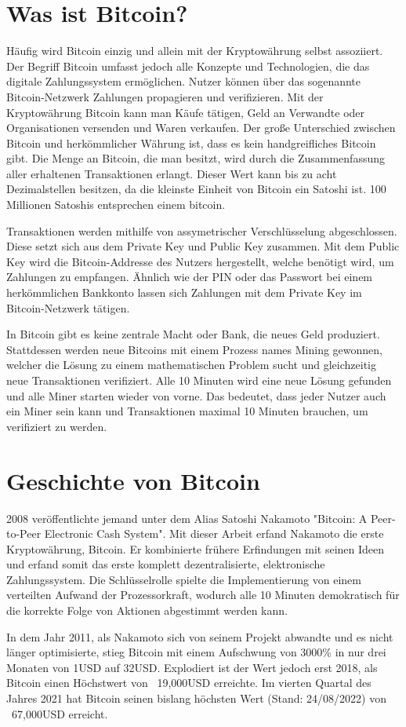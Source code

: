 \section{Was ist Bitcoin?}
Häufig wird Bitcoin einzig und allein mit der Kryptowährung selbst assoziiert. Der Begriff Bitcoin umfasst jedoch alle 
Konzepte und Technologien, die das digitale Zahlungssystem ermöglichen. Nutzer können über das sogenannte Bitcoin-Netzwerk 
Zahlungen propagieren und verifizieren. Mit der Kryptowährung Bitcoin kann man Käufe tätigen, Geld an Verwandte oder
Organisationen versenden und Waren verkaufen. Der große Unterschied zwischen Bitcoin und herkömmlicher Währung ist, dass es 
kein handgreifliches Bitcoin gibt. Die Menge an Bitcoin, die man besitzt, wird durch die Zusammenfassung aller erhaltenen 
Transaktionen erlangt. Dieser Wert kann bis zu acht Dezimalstellen besitzen, da die kleinste Einheit von Bitcoin ein Satoshi
ist. 100 Millionen Satoshis entsprechen einem bitcoin.

Transaktionen werden mithilfe von assymetrischer Verschlüsselung abgeschlossen. Diese setzt sich aus dem Private Key und Public
Key zusammen. Mit dem Public Key wird die Bitcoin-Addresse des Nutzers hergestellt, welche benötigt wird, um Zahlungen zu
empfangen. Ähnlich wie der PIN oder das Passwort bei einem herkömmlichen Bankkonto lassen sich Zahlungen mit dem Private Key
im Bitcoin-Netzwerk tätigen.

In Bitcoin gibt es keine zentrale Macht oder Bank, die neues Geld produziert. Stattdessen werden neue Bitcoins mit einem Prozess
names Mining gewonnen, welcher die Lösung zu einem mathematischen Problem sucht und gleichzeitig neue Transaktionen verifiziert.
Alle 10 Minuten wird eine neue Lösung gefunden und alle Miner starten wieder von vorne. Das bedeutet, dass jeder Nutzer auch ein
Miner sein kann und Transaktionen maximal 10 Minuten brauchen, um verifiziert zu werden.

\section{Geschichte von Bitcoin}
2008 veröffentlichte jemand unter dem Alias Satoshi Nakamoto "Bitcoin: A Peer-to-Peer Electronic Cash System". Mit dieser Arbeit
erfand Nakamoto die erste Kryptowährung, Bitcoin. Er kombinierte frühere Erfindungen mit seinen Ideen und erfand somit das erste
komplett dezentralisierte, elektronische Zahlungssystem. Die Schlüsselrolle spielte die Implementierung von einem verteilten
Aufwand der Prozessorkraft, wodurch alle 10 Minuten demokratisch für die korrekte Folge von Aktionen abgestimmt werden kann.

In dem Jahr 2011, als Nakamoto sich von seinem Projekt abwandte und es nicht länger optimisierte, stieg Bitcoin mit einem
Aufschwung von 3000\% in nur drei Monaten von 1USD auf 32USD. Explodiert ist der Wert jedoch erst 2018, als Bitcoin einen
Höchstwert von ~19,000USD erreichte. Im vierten Quartal des Jahres 2021 hat Bitcoin seinen bislang höchsten Wert (Stand: 24/08/2022)
von ~67,000USD erreicht.
